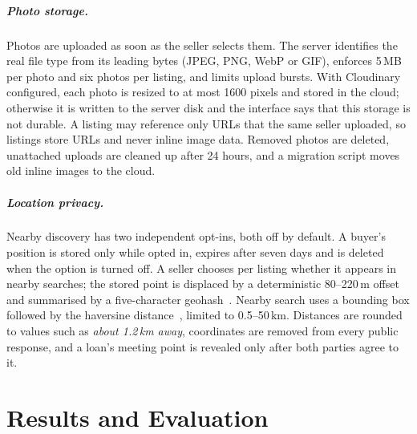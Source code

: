 \documentclass[12pt,letterpaper,twoside,openany]{report}
\begin{document}
\paragraph{Photo storage.} Photos are uploaded as soon as the seller selects them. The server identifies the
real file type from its leading bytes (JPEG, PNG, WebP or GIF), enforces 5\,MB per photo and six photos per
listing, and limits upload bursts. With Cloudinary~\cite{cloudinary} configured, each photo is resized to at
most 1600 pixels and stored in the cloud; otherwise it is written to the server disk and the interface says
that this storage is not durable. A listing may reference only URLs that the same seller uploaded, so
listings store URLs and never inline image data. Removed photos are deleted, unattached uploads are cleaned
up after 24 hours, and a migration script moves old inline images to the cloud.

\paragraph{Location privacy.} Nearby discovery has two independent opt-ins, both off by default. A buyer's
position is stored only while opted in, expires after seven days and is deleted when the option is turned
off. A seller chooses per listing whether it appears in nearby searches; the stored point is displaced by a
deterministic 80--220\,m offset and summarised by a five-character geohash~\cite{geohash}. Nearby search uses
a bounding box followed by the haversine distance~\cite{sinnott}, limited to 0.5--50\,km. Distances are
rounded to values such as \emph{about 1.2\,km away}, coordinates are removed from every public response, and a
loan's meeting point is revealed only after both parties agree to it.

\chapter{Results and Evaluation}\label{ch:results}
\end{document}
